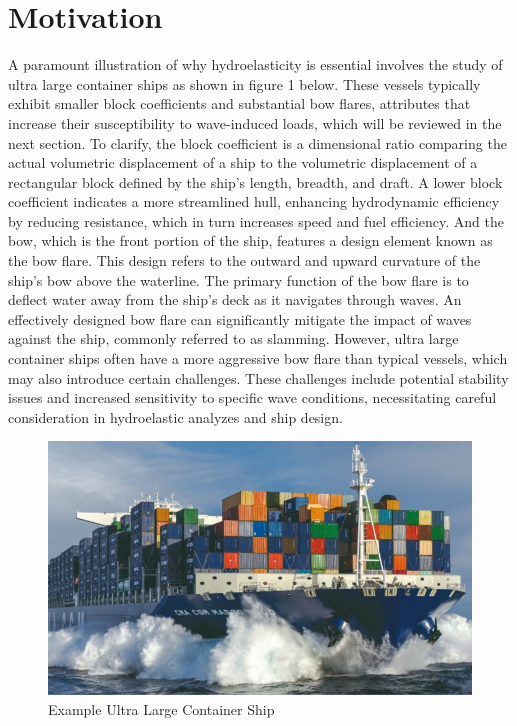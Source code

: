 \documentclass[12pt]{article} %
\begin{document}
\section{Motivation}
A paramount illustration of why hydroelasticity is essential involves the study of ultra large container ships as shown in figure 1 below. 
These vessels typically exhibit smaller block coefficients and substantial bow flares, attributes that increase their 
susceptibility to wave-induced loads, which will be reviewed in the next section. To clarify, the block coefficient is a dimensional ratio comparing the actual 
volumetric displacement of a ship to the volumetric displacement of a rectangular block defined by the ship’s length, 
breadth, and draft. A lower block coefficient indicates a more streamlined hull, enhancing hydrodynamic efficiency by 
reducing resistance, which in turn increases speed and fuel efficiency. And the bow, which is the front portion of the ship, 
features a design element known as the bow flare. This design refers to the outward and upward curvature of the ship's bow above the waterline. 
The primary function of the bow flare is to deflect water away from the ship's deck as it navigates through waves. An effectively designed bow flare 
can significantly mitigate the impact of waves against the ship, commonly referred to as slamming. However, ultra large container 
ships often have a more aggressive bow flare than typical vessels, which may also introduce certain challenges. These 
challenges include potential stability issues and increased sensitivity to specific wave conditions, necessitating careful consideration in hydroelastic analyzes and ship design.
\begin{figure}[ht]
    \centering
    \includegraphics[width=1\textwidth]{ULCS.png}
    \caption{Example Ultra Large Container Ship}
\end{figure}
\end{document}
